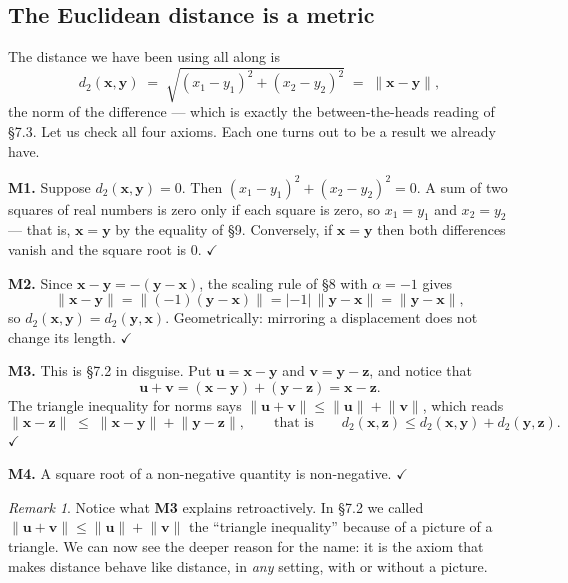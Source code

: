 \documentclass[11pt]{article}
\theoremstyle{definition}
\theoremstyle{remark}
\newtheorem*{rmk}{Remark}
\newcommand{\vc}[1]{\mathbf{#1}}
\newcommand{\norm}[1]{\lVert #1\rVert}
\begin{document}
\subsection{The Euclidean distance is a metric}
The distance we have been using all along is
\[
  d_2(\vc{x},\vc{y})
  \;=\; \sqrt{(x_1-y_1)^{2}+(x_2-y_2)^{2}}
  \;=\; \norm{\vc{x}-\vc{y}} ,
\]
the norm of the difference --- which is exactly the between-the-heads reading of
\S7.3. Let us check all four axioms. Each one turns out to be a result we
already have.

\smallskip
\noindent\textbf{M1.} Suppose $d_2(\vc{x},\vc{y})=0$. Then
$(x_1-y_1)^{2}+(x_2-y_2)^{2}=0$. A sum of two squares of real numbers is zero
only if each square is zero, so $x_1=y_1$ and $x_2=y_2$ --- that is,
$\vc{x}=\vc{y}$ by the equality of \S9. Conversely, if $\vc{x}=\vc{y}$ then both
differences vanish and the square root is $0$. \hfill$\checkmark$

\smallskip
\noindent\textbf{M2.} Since $\vc{x}-\vc{y}=-(\vc{y}-\vc{x})$, the scaling rule
of \S8 with $\alpha=-1$ gives
\[
  \norm{\vc{x}-\vc{y}}
  = \norm{(-1)(\vc{y}-\vc{x})}
  = \lvert -1\rvert\,\norm{\vc{y}-\vc{x}}
  = \norm{\vc{y}-\vc{x}} ,
\]
so $d_2(\vc{x},\vc{y})=d_2(\vc{y},\vc{x})$. Geometrically: mirroring a
displacement does not change its length. \hfill$\checkmark$

\smallskip
\noindent\textbf{M3.} This is \S7.2 in disguise. Put
$\vc{u}=\vc{x}-\vc{y}$ and $\vc{v}=\vc{y}-\vc{z}$, and notice that
\[
  \vc{u}+\vc{v} = (\vc{x}-\vc{y})+(\vc{y}-\vc{z}) = \vc{x}-\vc{z} .
\]
The triangle inequality for norms says $\norm{\vc{u}+\vc{v}}\le
\norm{\vc{u}}+\norm{\vc{v}}$, which reads
\[
  \norm{\vc{x}-\vc{z}} \;\le\; \norm{\vc{x}-\vc{y}}+\norm{\vc{y}-\vc{z}},
  \qquad\text{that is}\qquad
  d_2(\vc{x},\vc{z}) \le d_2(\vc{x},\vc{y})+d_2(\vc{y},\vc{z}) .
\]
\hfill$\checkmark$

\smallskip
\noindent\textbf{M4.} A square root of a non-negative quantity is
non-negative. \hfill$\checkmark$

\begin{rmk}
Notice what \textbf{M3} explains retroactively. In \S7.2 we called
$\norm{\vc{u}+\vc{v}}\le\norm{\vc{u}}+\norm{\vc{v}}$ the ``triangle
inequality'' because of a picture of a triangle. We can now see the deeper
reason for the name: it is the axiom that makes distance behave like distance,
in \emph{any} setting, with or without a picture.
\end{rmk}
\end{document}
